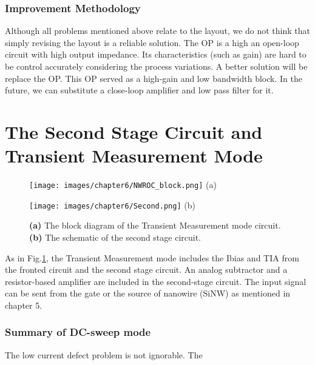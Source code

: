 \subsubsection{Improvement Methodology}
Although all problems mentioned above relate to the layout, we do not think that simply revising the layout is a reliable solution.
The OP is a high an open-loop circuit with high output impedance.
Its characteristics (such as gain) are hard to be control accurately considering the process variations.
A better solution will be replace the OP.
This OP served as a high-gain and low bandwidth block.
In the future, we can substitute a close-loop amplifier and low pass filter for it.


\section{The Second Stage Circuit and Transient Measurement Mode}
\begin{figure}[tb!hp]
    \begin{minipage}[t]{0.5\textwidth}
        \centering
        \texttt{[image: images/chapter6/NWROC\_block.png]}
        \raggedleft
        (a)
    \end{minipage}
    \hfill
    \begin{minipage}[t]{0.5\textwidth}
        \centering
        \texttt{[image: images/chapter6/Second.png]}
        \raggedleft
        (b)
    \end{minipage}
    \caption{\textbf{(a)} The block diagram of the Transient Measurement mode circuit. \textbf{(b)} The schematic of the second stage circuit.}
    \label{fig:chip:ACschem}
\end{figure}

As in Fig.\ref{fig:chip:ACschem}, the Transient Measurement mode includes the Ibias and TIA from the fronted circuit and the second stage circuit.
An analog subtractor and a resistor-based amplifier are included in the second-stage circuit.
The input signal can be sent from the gate or the source of nanowire (SiNW) as mentioned in chapter 5.


\subsubsection{Summary of DC-sweep mode}

{\color{red}The low current defect problem is not ignorable.
The }

